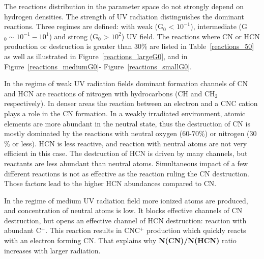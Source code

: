 \documentclass{aa}
\begin{document}
The reactions distribution in the parameter space do not strongly depend on hydrogen
densities. The strength of UV radiation distinguishes the
dominant reactions. Three regimes are defined: with weak (G$_0$ < $10^{-1}$), intermediate (G$_0 \sim 10^{-1}-10^1$) and strong (G$_0$ > $10^{2}$) UV field. The reactions where CN or HCN production or destruction is greater than 30$\%$ are listed
in Table~\ref{reactions_50} as well as illustrated in Figure~\ref{reactions_largeG0}, and in Figure~\ref{reactions_mediumG0}-
Figure~\ref{reactions_smallG0}.

In the regime of weak UV radiation fields dominant formation channels of CN and HCN are reactions of nitrogen with hydrocarbons
(CH and CH$_2$ respectively). In denser areas the reaction between an electron and a CNC cation plays a role in the CN formation. In a weakly irradiated environment, atomic elements are more abundant in the neutral state, thus the destruction of CN is mostly dominated by the
reactions with neutral oxygen (60-70$\%$) or nitrogen (30$\%$ or less). HCN is less reactive, and reaction with neutral atoms are not very efficient in this case. The destruction of HCN is driven by many channels, but reactants are less abundant than neutral atoms. Simultaneous impact of a few different reactions is not as effective as the reaction ruling the CN destruction. Those factors lead to the higher HCN abundances compared to CN.


In the regime of medium UV radiation field more ionized atoms are produced, and concentration of neutral atoms is low. It blocks effective channels of CN destruction, but opens an effective channel of HCN destruction: reaction with abundant C$^+$. This reaction
results in CNC$^+$ production which quickly reacts with an electron forming CN. That explains why \textbf{N(CN)/N(HCN)} ratio increases with larger radiation.
\end{document}
